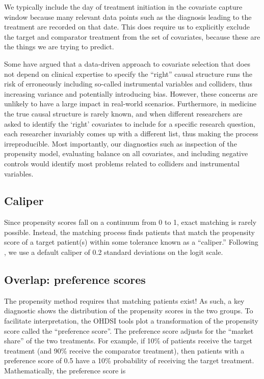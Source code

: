 \documentclass[11pt]{book}
\theoremstyle{definition}
\theoremstyle{definition}
\theoremstyle{definition}
\theoremstyle{remark}
\let\BeginKnitrBlock\begin \let\EndKnitrBlock\end
\begin{document}
\BeginKnitrBlock{rmdimportant}
We typically include the day of treatment initiation in the covariate capture window because many relevant data points such as the diagnosis leading to the treatment are recorded on that date. This does require us to explicitly exclude the target and comparator treatment from the set of covariates, because these are the things we are trying to predict.
\EndKnitrBlock{rmdimportant}

Some have argued that a data-driven approach to covariate selection that does not depend on clinical expertise to specify the ``right'' causal structure runs the risk of erroneously including so-called instrumental variables and colliders, thus increasing variance and potentially introducing bias. \citep{hernan_2002} However, these concerns are unlikely to have a large impact in real-world scenarios. \citep{schneeweiss_2018} Furthermore, in medicine the true causal structure is rarely known, and when different researchers are asked to identify the `right' covariates to include for a specific research question, each researcher invariably comes up with a different list, thus making the process irreproducible. Most importantly, our diagnostics such as inspection of the propensity model, evaluating balance on all covariates, and including negative controls would identify most problems related to colliders and instrumental variables.  

\hypertarget{caliper}{%
\subsection{Caliper}\label{caliper}}


Since propensity scores fall on a continuum from 0 to 1, exact matching is rarely possible. Instead, the matching process finds patients that match the propensity score of a target patient(s) within some tolerance known as a ``caliper.'' Following \citet{austin_2011}, we use a default caliper of 0.2 standard deviations on the logit scale.

\hypertarget{overlap-preference-scores}{%
\subsection{Overlap: preference scores}\label{overlap-preference-scores}}


The propensity method requires that matching patients exist! As such, a key diagnostic shows the distribution of the propensity scores in the two groups. To facilitate interpretation, the OHDSI tools plot a transformation of the propensity score called the ``preference score''. \citep{walker_2013} The preference score adjusts for the ``market share'' of the two treatments. For example, if 10\% of patients receive the target treatment (and 90\% receive the comparator treatment), then patients with a preference score of 0.5 have a 10\% probability of receiving the target treatment. Mathematically, the preference score is
\end{document}
